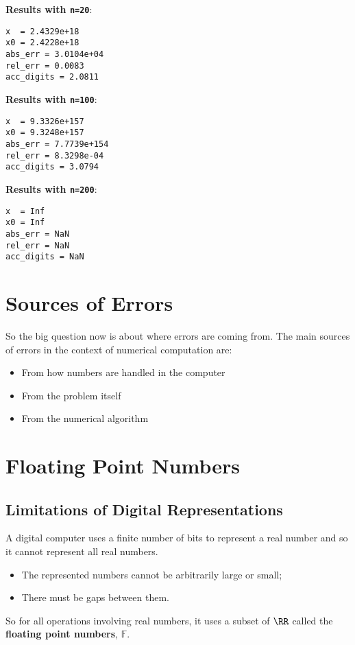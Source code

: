 \documentclass[]{ximera}
\begin{document}
\begingroup\scriptsize
\begin{minipage}{0.31\linewidth}
\textbf{Results with \texttt{n=20}}:
\begin{verbatim}
x  = 2.4329e+18
x0 = 2.4228e+18
abs_err = 3.0104e+04
rel_err = 0.0083
acc_digits = 2.0811
\end{verbatim}
\end{minipage}
\hfill
\begin{minipage}{0.31\linewidth}
\textbf{Results with \texttt{n=100}}:
\begin{verbatim}
x  = 9.3326e+157
x0 = 9.3248e+157
abs_err = 7.7739e+154
rel_err = 8.3298e-04
acc_digits = 3.0794
\end{verbatim}
\end{minipage}
\hfill
\begin{minipage}{0.31\linewidth}
\textbf{Results with \texttt{n=200}}:
\begin{verbatim}
x  = Inf
x0 = Inf
abs_err = NaN
rel_err = NaN
acc_digits = NaN
\end{verbatim}
\end{minipage}
\endgroup

\section{Sources of Errors}
\label{sec:org2296ed9}
So the big question now is about where errors are coming from. The main sources of errors in the context of numerical computation are:

\begin{itemize}
\item From how numbers are handled in the computer \hfill  {\color{gray}{(floting point numbers)}}
\item From the problem itself \hfill  {\color{gray}{(conditioning)}}
\item From the numerical algorithm \hfill  {\color{gray}{(stability)}}
\end{itemize}

\section{Floating Point Numbers}
\label{sec:orgb1612d1}
\subsection{Limitations of Digital Representations}
\label{sec:orga9dcf25}
A digital computer uses a finite number of bits to represent a real number and so it cannot represent all real numbers.
\begin{itemize}
\item The represented numbers cannot be arbitrarily large or small;
\item There must be gaps between them.
\end{itemize}
So for all operations involving real numbers, it uses a subset of $\RR$ called the \textbf{floating point numbers}, $\mathbb{F}$.
\end{document}

